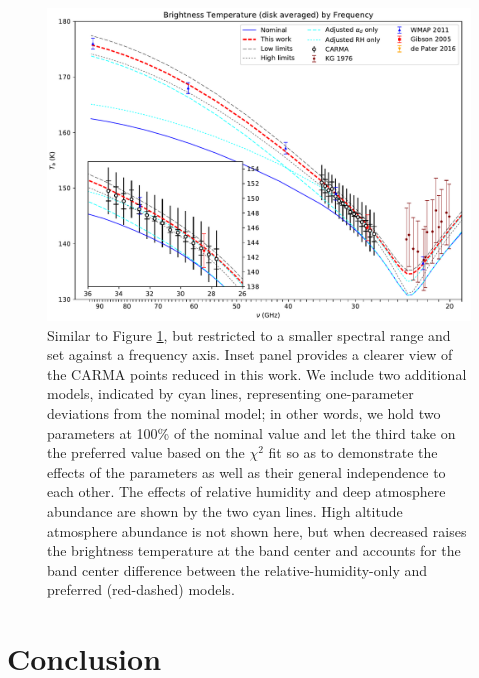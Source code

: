 \documentclass{article}
\begin{document}
	\begin{figure}
		\centering
		\includegraphics[width=\textwidth]{final_models_freq.pdf}
		\caption{\label{fig:emission_freq}Similar to Figure \ref{fig:emission_freq}, but restricted to a smaller spectral range and set against a frequency axis. Inset panel provides a clearer view of the CARMA points reduced in this work. We include two additional models, indicated by cyan lines, representing one-parameter deviations from the nominal model; in other words, we hold two parameters at 100\% of the nominal value and let the third take on the preferred value based on the $\chi^{2}$ fit so as to demonstrate the effects of the parameters as well as their general independence to each other. The effects of relative humidity and deep atmosphere abundance are shown by the two cyan lines. High altitude atmosphere abundance is not shown here, but when decreased raises the brightness temperature at the band center and accounts for the band center difference between the relative-humidity-only and preferred (red-dashed) models.}
	\end{figure}


\section{Conclusion}
\end{document}
